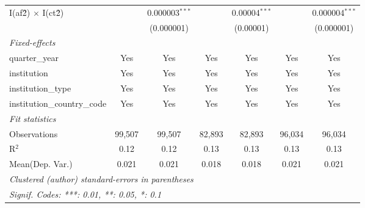 \begin{tabular}{lcccccc}
   I(af\^2) $\times$ I(ct\^2)         &               & 0.000003$^{***}$ &               & 0.00004$^{***}$ &               & 0.000004$^{***}$\\   
                                      &               & (0.000001)       &               & (0.00001)       &               & (0.000001)\\   
   \midrule
   \emph{Fixed-effects}\\
   quarter\_year                      & Yes           & Yes              & Yes           & Yes             & Yes           & Yes\\  
   institution                        & Yes           & Yes              & Yes           & Yes             & Yes           & Yes\\  
   institution\_type                  & Yes           & Yes              & Yes           & Yes             & Yes           & Yes\\  
   institution\_country\_code         & Yes           & Yes              & Yes           & Yes             & Yes           & Yes\\  
   \midrule
   \emph{Fit statistics}\\
   Observations                       & 99,507        & 99,507           & 82,893        & 82,893          & 96,034        & 96,034\\  
   R$^2$                              & 0.12          & 0.12             & 0.13          & 0.13            & 0.13          & 0.13\\  
Mean(Dep. Var.) & 0.021 & 0.021 & 0.018 & 0.018 & 0.021 & 0.021 \\
   \midrule \midrule
   \multicolumn{7}{l}{\emph{Clustered (author) standard-errors in parentheses}}\\
   \multicolumn{7}{l}{\emph{Signif. Codes: ***: 0.01, **: 0.05, *: 0.1}}\\
\end{tabular}
\par\endgroup
